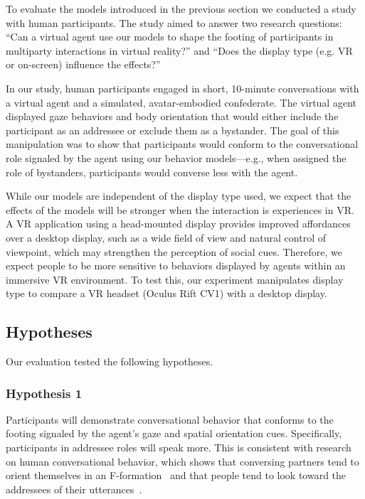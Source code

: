 To evaluate the models introduced in the previous section we conducted a study with human participants.
The study aimed to answer two research questions: ``Can a virtual agent use our  models to shape the footing of participants in multiparty interactions in virtual reality?'' and ``Does the display type (e.g. VR or on-screen) influence the effects?''

In our study, human participants engaged in short, 10-minute conversations with a virtual agent and a simulated, avatar-embodied confederate. The virtual agent displayed gaze behaviors and body orientation that would either include the participant as an addressee or exclude them as a bystander. The goal of this manipulation was to show that participants would conform to the conversational role signaled by the agent using our behavior models---e.g., when assigned the role of bystanders, participants would converse less with the agent.

While our models are independent of the display type used, we expect that the effects of the models will be stronger when the interaction is experiences in VR. A VR application using a head-mounted display provides improved affordances over a desktop display, such as a wide field of view and natural control of viewpoint, which may strengthen the perception of social cues. Therefore, we expect people to be more sensitive to behaviors displayed by agents within an immersive VR environment.
To test this, our experiment manipulates display type to compare a VR headset (Oculus Rift CV1) with a desktop display.

\subsection{Hypotheses}

Our evaluation tested the following hypotheses.

\subsubsection{Hypothesis 1}

Participants will demonstrate conversational behavior that conforms to the footing signaled by the agent's gaze and spatial orientation cues. Specifically, participants in addressee roles will speak more. This is consistent with research on human conversational behavior, which shows that conversing partners tend to orient themselves in an F-formation~\cite{kendon1990conducting} and that people tend to look toward the addressees of their utterances~\cite{kendon1967some}.

